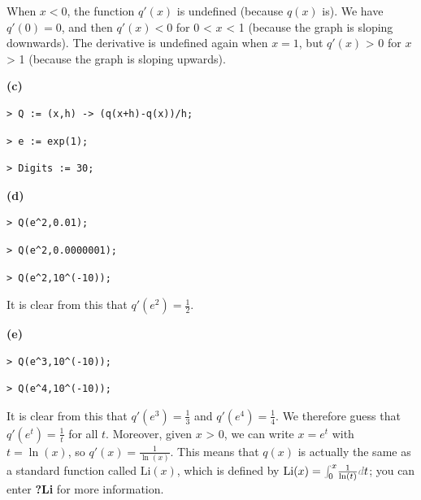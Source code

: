 \documentclass{article}
\begin{document}
\begin{Maple Normal}
When 
$x <0$, the function 
$\mathit{q'} (x)$ is undefined (because 
$q (x)$ is).  We have 
$\mathit{q'} (0)=0$, and then 
$\mathit{q'} (x)<0$ for 0 < 
$x $ < 1 (because the graph is sloping downwards).  The derivative is undefined again when 
$x =1$, but 
$\mathit{q'} (x)$ > 0 for 
$x $ > 1 (because the graph is sloping upwards).
\end{Maple Normal}
\begin{Maple Normal}
\textbf{(c)}
\end{Maple Normal}
\begin{lstlisting}
> Q := (x,h) -> (q(x+h)-q(x))/h;
\end{lstlisting}
\begin{lstlisting}
> e := exp(1);
\end{lstlisting}
\begin{lstlisting}
> Digits := 30;
\end{lstlisting}
\begin{Maple Normal}
\textbf{(d)}
\end{Maple Normal}
\begin{lstlisting}
> Q(e^2,0.01);
\end{lstlisting}
\begin{lstlisting}
> Q(e^2,0.0000001);
\end{lstlisting}
\begin{lstlisting}
> Q(e^2,10^(-10));
\end{lstlisting}
\begin{Maple Normal}
It is clear from this that 
$\mathit{q'} (e^{2})=\frac{1}{2}$.
\end{Maple Normal}
\begin{Maple Normal}
\textbf{(e)}
\end{Maple Normal}
\begin{lstlisting}
> Q(e^3,10^(-10));
\end{lstlisting}
\begin{lstlisting}
> Q(e^4,10^(-10));
\end{lstlisting}
\begin{Maple Normal}
It is clear from this that 
$\mathit{q'} (e^{3})=\frac{1}{3}$ and 
$\mathit{q'} (e^{4})=\frac{1}{4}$.  We therefore guess that 
$\mathit{q'} (e^{t})=\frac{1}{t}$ for all 
$t $.  Moreover, given 
$x $ > 0, we can write 
$x =e^{t}$ with 
$t =\ln (x)$, so 
$\mathit{q'} (x)=\frac{1}{\ln (x)}$.  This means that 
$q (x)$ is actually the same as a standard function called 
$\mathrm{Li}(x)$, which is defined by 
$\mathrm{Li}(x)={\textcolor{gray}{\int}}_{\!\!0}^{x}\frac{1}{\ln (t)}\textcolor{gray}{d}t $; you can enter  \textcolor[RGB]{255,0,0}{\textbf{?Li}} for more information.
\end{Maple Normal}
\end{document}
